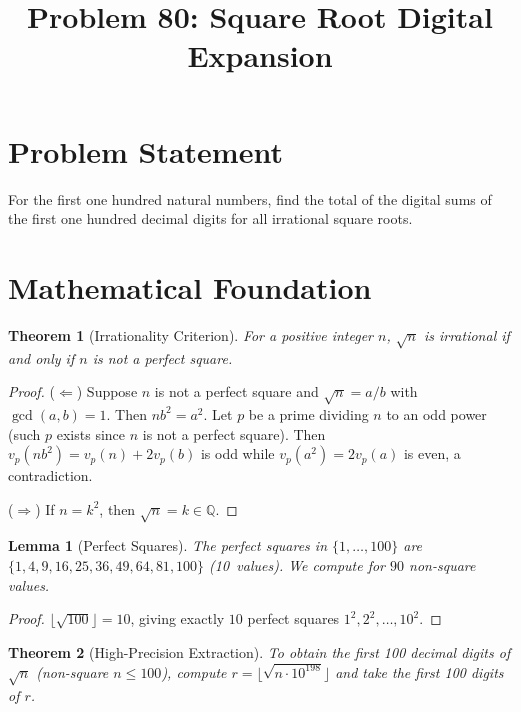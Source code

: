 \documentclass[11pt]{article}
\title{Problem 80: Square Root Digital Expansion}
\author{}
\date{}
\newtheorem{theorem}{Theorem}
\newtheorem{lemma}{Lemma}
\begin{document}
\maketitle

\section{Problem Statement}

For the first one hundred natural numbers, find the total of the digital sums of the first one hundred decimal digits for all irrational square roots.

\section{Mathematical Foundation}

\begin{theorem}[Irrationality Criterion]
For a positive integer $n$, $\sqrt{n}$ is irrational if and only if $n$ is not a perfect square.
\end{theorem}

\begin{proof}
($\Leftarrow$) Suppose $n$ is not a perfect square and $\sqrt{n} = a/b$ with $\gcd(a,b) = 1$. Then $nb^2 = a^2$. Let $p$ be a prime dividing $n$ to an odd power (such $p$ exists since $n$ is not a perfect square). Then $v_p(nb^2) = v_p(n) + 2v_p(b)$ is odd while $v_p(a^2) = 2v_p(a)$ is even, a contradiction.

($\Rightarrow$) If $n = k^2$, then $\sqrt{n} = k \in \mathbb{Q}$.
\end{proof}

\begin{lemma}[Perfect Squares]
The perfect squares in $\{1, \ldots, 100\}$ are $\{1, 4, 9, 16, 25, 36, 49, 64, 81, 100\}$ (10~values). We compute for $90$ non-square values.
\end{lemma}

\begin{proof}
$\lfloor\sqrt{100}\rfloor = 10$, giving exactly $10$ perfect squares $1^2, 2^2, \ldots, 10^2$.
\end{proof}

\begin{theorem}[High-Precision Extraction]
To obtain the first 100 decimal digits of $\sqrt{n}$ (non-square $n \leq 100$), compute $r = \lfloor\sqrt{n \cdot 10^{198}}\rfloor$ and take the first 100 digits of $r$.
\end{theorem}
\end{document}
